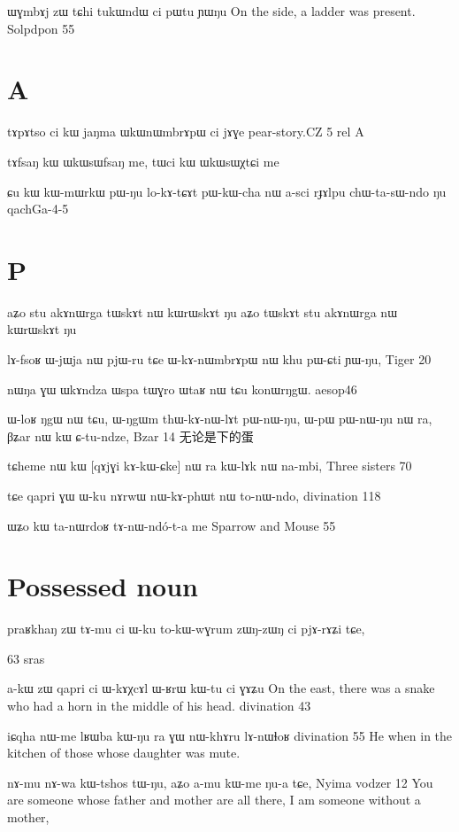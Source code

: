 \documentclass[oldfontcommands,oneside,a4paper,11pt]{memoir}
\newcommand{\wav}[1]{}%
\begin{document}
ɯɣmbɤj zɯ tɕhi tukɯndɯ ci pɯtu ɲɯŋu
On the side, a ladder was present.
Solpdpon 55



\section{A}
tɤpɤtso ci kɯ jaŋma ɯkɯnɯmbrɤpɯ ci jɤɣe
pear-story.CZ 5 rel A

tɤfsaŋ kɯ ɯkɯsɯfsaŋ me, tɯci kɯ ɯkɯsɯχtɕi me


ɕu	kɯ	kɯ-mɯrkɯ	pɯ-ŋu	lo-kɤ-tɕɤt	pɯ-kɯ-cha	nɯ a-sci	rɟɤlpu	chɯ-ta-sɯ-ndo	ŋu
qachGa-4-5




\section{P}

aʑo stu akɤnɯrga tɯskɤt nɯ kɯrɯskɤt ŋu
aʑo tɯskɤt stu akɤnɯrga nɯ kɯrɯskɤt ŋu
\wav{gram-akAnWrga}



	lɤ-fsoʁ ɯ-jɯja nɯ pjɯ-ru tɕe ɯ-kɤ-nɯmbrɤpɯ nɯ khu pɯ-ɕti ɲɯ-ŋu,
Tiger 20



nɯŋa ɣɯ ɯkɤndza ɯspa tɯɣro ɯtaʁ nɯ tɕu konɯrŋgɯ. 
aesop46

ɯ-loʁ	ŋgɯ	nɯ	tɕu,	ɯ-ŋgɯm	thɯ-kɤ-nɯ-lɤt	pɯ-nɯ-ŋu, ɯ-pɯ	pɯ-nɯ-ŋu	nɯ	ra,	βʑar	nɯ	kɯ	ɕ-tu-ndze,
Bzar 14 无论是下的蛋

tɕheme	nɯ	kɯ	[qɤjɣi	kɤ-kɯ-ɕke]	nɯ	ra	kɯ-lɤk	nɯ	na-mbi,
Three sisters 70

tɕe	qapri	ɣɯ	ɯ-ku	nɤrwɯ	nɯ-kɤ-phɯt	nɯ	to-nɯ-ndo,
divination 118

ɯʑo kɯ ta-nɯrdoʁ tɤ-nɯ-ndó-t-a me
Sparrow and Mouse 55
 
\section{Possessed noun}
praʁkhaŋ zɯ tɤ-mu ci ɯ-ku to-kɯ-wɣrum zɯŋ-zɯŋ ci pjɤ-rɤʑi tɕe,

63 sras


a-kɯ zɯ qapri ci ɯ-kɤχcɤl ɯ-ʁrɯ kɯ-tu ci ɣɤʑu 
On the east, there was a snake who had a horn in the middle of his head.
divination 43


 iɕqha nɯ-me lʁɯba kɯ-ŋu ra ɣɯ nɯ-khɤru lɤ-nɯɬoʁ
 divination 55
 He when in the kitchen of those whose daughter was mute.
 
nɤ-mu	nɤ-wa	kɯ-tshos	tɯ-ŋu, aʑo	a-mu	kɯ-me	ŋu-a	tɕe,
Nyima vodzer 12
You are someone whose father and mother are all there, I am someone without a mother, 
 
\end{document}
